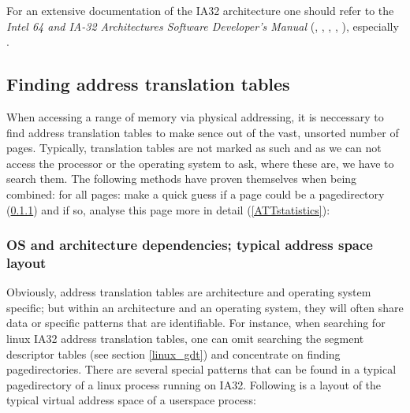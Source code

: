 For an extensive documentation of the IA32 architecture one should refer to the
\emph{Intel 64 and IA-32 Architectures Software Developer's Manual}
(\cite{IA32_SDM_1:2006}, \cite{IA32_SDM_2a:2006}, \cite{IA32_SDM_2b:2006},
\cite{IA32_SDM_3a:2006}, \cite{IA32_SDM_3b:2006}), especially
\cite{IA32_SDM_3a:2006}.



\subsection{Finding address translation tables}
\label{findingATT}

When accessing a range of memory via physical addressing, it is neccessary to
find address translation tables to make sence out of the vast, unsorted number
of pages. Typically, translation tables are not marked as such and as we can not
access the processor or the operating system to ask, where these are, we have to
search them. The following methods have proven themselves when being combined:
for all pages: make a quick guess if a page could be a pagedirectory
(\ref{ATTguess}) and if so, analyse this page more in detail
(\ref{ATTstatistics}):



\subsubsection{OS and architecture dependencies; typical address space layout}

\label{ATTguess} Obviously, address translation tables are architecture and
operating system specific; but within an architecture and an operating system,
they will often share data or specific patterns that are identifiable. For
instance, when searching for linux IA32 address translation tables, one can omit
searching the segment descriptor tables (see section \ref{linux_gdt}) and
concentrate on finding pagedirectories. There are several special patterns that
can be found in a typical pagedirectory of a linux process running on IA32.
Following is a layout of the typical virtual address space of a userspace
process:

